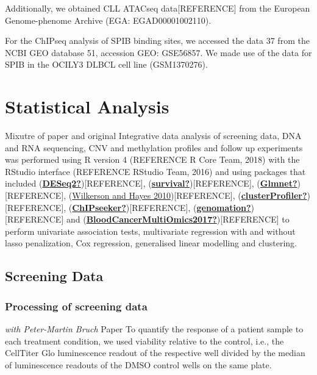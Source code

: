 \documentclass[11pt, a4paper, twosided]{book}
\begin{document}
Additionally, we obtained CLL ATACseq data{[}REFERENCE{]} from the European Genome-phenome Archive (EGA: EGAD00001002110).

For the ChIPseq analysis of SPIB binding sites, we accessed the data 37 from the NCBI GEO database 51, accession GEO: GSE56857. We made use of the data for SPIB in the OCILY3 DLBCL cell line (GSM1370276).

\hypertarget{statistical-analysis}{%
\chapter{Statistical Analysis}\label{statistical-analysis}}

Mixutre of paper and original
Integrative data analysis of screening data, DNA and RNA sequencing, CNV and methylation profiles and follow up experiments was performed using R version 4 (REFERENCE R Core Team, 2018) with the RStudio interface (REFERENCE RStudio Team, 2016) and using packages that included (\protect\hyperlink{ref-DESeq2}{\textbf{DESeq2?}}){[}REFERENCE{]}, (\protect\hyperlink{ref-survival}{\textbf{survival?}}){[}REFERENCE{]}, (\protect\hyperlink{ref-Glmnet}{\textbf{Glmnet?}}){[}REFERENCE{]}, (\protect\hyperlink{ref-ConsensusClusterPlus}{Wilkerson and Hayes 2010}){[}REFERENCE{]}, (\protect\hyperlink{ref-clusterProfiler}{\textbf{clusterProfiler?}}){[}REFERENCE{]}, (\protect\hyperlink{ref-ChIPseeker}{\textbf{ChIPseeker?}}){[}REFERENCE{]}, (\protect\hyperlink{ref-genomation}{\textbf{genomation?}}){[}REFERENCE{]} and (\protect\hyperlink{ref-BloodCancerMultiOmics2017}{\textbf{BloodCancerMultiOmics2017?}}){[}REFERENCE{]} to perform univariate association tests, multivariate regression with and without lasso penalization, Cox regression, generalised linear modelling and clustering.

\hypertarget{screening-data}{%
\section{Screening Data}\label{screening-data}}

\hypertarget{processing-of-screening-data}{%
\subsection{Processing of screening data}\label{processing-of-screening-data}}

\emph{with Peter-Martin Bruch} Paper
To quantify the response of a patient sample to each treatment condition, we used viability relative to the control, i.e., the CellTiter Glo luminescence readout of the respective well divided by the median of luminescence readouts of the DMSO control wells on the same plate.
\end{document}
